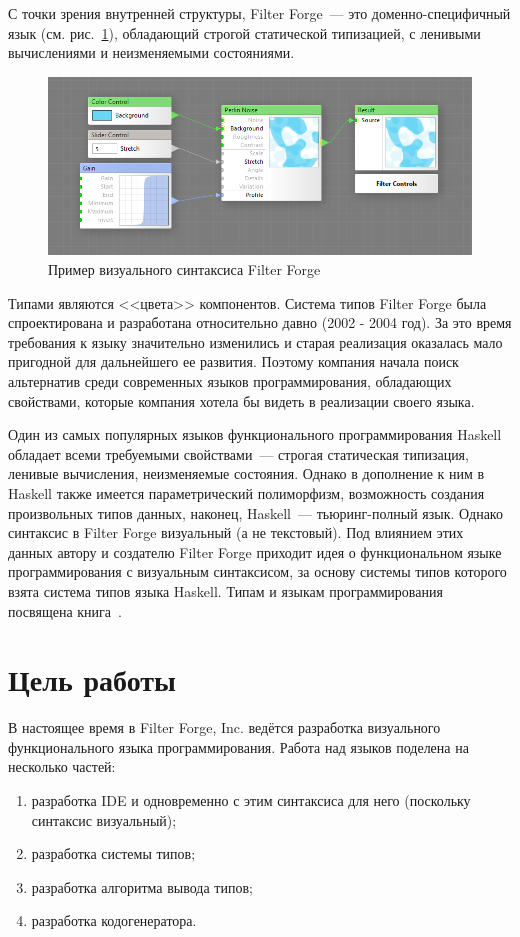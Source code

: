 С точки зрения внутренней структуры, Filter Forge~--- это доменно-специфичный язык (см. рис.~\ref{forge}), обладающий строгой статической типизацией, с ленивыми вычислениями и неизменяемыми состояниями.
\begin{figure}
	\centering
	\includegraphics[width=\textwidth]{img/forge.png}
	\caption{Пример визуального синтаксиса Filter Forge}\label{forge}
\end{figure}
 Типами являются <<цвета>> компонентов. Система типов Filter Forge была спроектирована и разработана относительно давно (2002 - 2004 год). За это время требования к языку значительно изменились и старая реализация оказалась мало пригодной для дальнейшего ее развития. Поэтому компания начала поиск альтернатив среди современных языков программирования, обладающих свойствами, которые компания хотела бы видеть в реализации своего языка.

Один из самых популярных языков функционального программирования Haskell обладает всеми требуемыми свойствами~--- строгая статическая типизация, ленивые вычисления, неизменяемые состояния. Однако в дополнение к ним в Haskell также имеется параметрический полиморфизм, возможность создания произвольных типов данных, наконец, Haskell~--- тьюринг-полный язык. Однако синтаксис в Filter Forge визуальный (а не текстовый). Под влиянием этих данных автору и создателю Filter Forge приходит идея о функциональном языке программирования с визуальным синтаксисом, за основу  системы типов которого взята система типов языка Haskell. Типам и языкам программирования посвящена книга~\autocite{pierce}.

\section*{Цель работы}
В настоящее время в Filter Forge, Inc. ведётся разработка визуального функционального языка программирования. Работа над языков поделена на несколько частей:
 \begin{enumerate}[1)]
 	\item разработка IDE и одновременно с этим синтаксиса для него (поскольку синтаксис визуальный);
 	\item разработка системы типов;
 	\item разработка алгоритма вывода типов;
 	\item разработка кодогенератора.
 \end{enumerate} 

